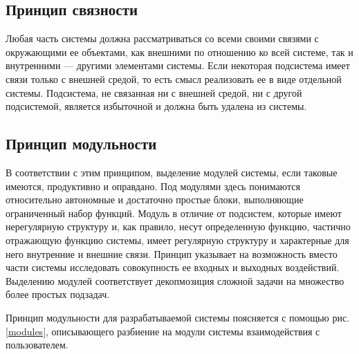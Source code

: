 \subsection{Принцип связности}

Любая часть системы должна рассматриваться со всеми своими связями с окружающими ее объектами, как внешними по отношению ко всей системе, так и внутренними --- другими элементами системы.
Если некоторая подсистема имеет связи только с внешней средой, то есть смысл реализовать ее в виде отдельной системы.
Подсистема, не связанная ни с внешней средой, ни с другой подсистемой, является избыточной и должна быть удалена из системы.





\subsection{Принцип модульности}

В соответствии с этим принципом, выделение модулей системы, если таковые имеются, продуктивно и оправдано.
Под модулями здесь понимаются относительно автономные и достаточно простые блоки, выполняющие ограниченный набор функций.
Модуль в отличие от подсистем, которые имеют нерегулярную структуру и, как правило, несут определенную функцию, частично отражающую функцию системы, имеет регулярную структуру и характерные для него внутренние и внешние связи.
Принцип указывает на возможность вместо части системы исследовать совокупность ее входных и выходных воздействий.
Выделению модулей соответствует декопмозиция сложной задачи на множество более простых подзадач.

Принцип модульности для разрабатываемой системы поясняется с помощью рис. \ref{modules}, описывающего разбиение на модули системы взаимодействия с пользователем.

